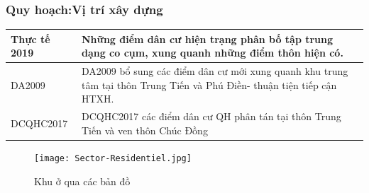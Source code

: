 \documentclass[../thesis.tex]{subfiles}
\begin{document}
\subsubsection{Quy hoạch:Vị trí xây dựng}
\begin{table}[h!]
\centering
\begin{tabular}{ | m{3cm} | m{12cm}| } 
\hline  
Thực tế 2019 & Những điểm dân cư hiện trạng phân bố tập trung dạng co cụm, xung quanh những điểm thôn hiện có. \\
\hline 
DA2009 & DA2009 bổ sung các điểm dân cư mới xung quanh khu trung tâm tại thôn Trung Tiến và Phú Điền- thuận tiện tiếp cận HTXH.
\\
\hline 
DCQHC2017 & DCQHC2017 các điểm dân cư QH phân tán tại thôn Trung Tiến và ven thôn Chúc Đồng\\
\hline 
\end{tabular}
\end{table}


\begin{figure}\texttt{[image: Sector-Residentiel.jpg]}\caption{Khu ở qua các bản đồ}\end{figure}
\clearpage
\end{document}
